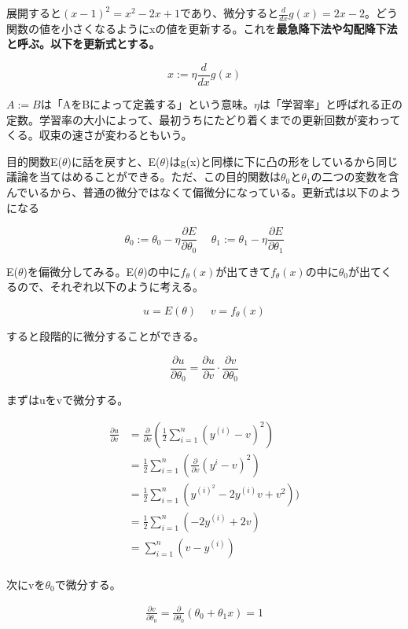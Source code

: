 \documentclass{jsarticle}
\begin{document}
展開すると$(x-1)^{2}=x^{2}-2x+1$であり、微分すると$\frac{d}{dx}g(x)=2x-2$。どう関数の値を小さくなるようにxの値を更新する。これを\bf{最急降下法}や\bf{勾配降下法}と呼ぶ。以下を更新式とする。

\[
	x := \eta\frac{d}{dx}g(x)
\]

$A := B$は「AをBによって定義する」という意味。$\eta$は「学習率」と呼ばれる正の定数。学習率の大小によって、最初うちにたどり着くまでの更新回数が変わってくる。収束の速さが変わるともいう。

目的関数E($\theta$)に話を戻すと、E($\theta$)はg(x)と同様に下に凸の形をしているから同じ議論を当てはめることができる。ただ、この目的関数は$\theta_0$と$\theta_1$の二つの変数を含んでいるから、普通の微分ではなくて偏微分になっている。更新式は以下のようになる

\[
	\theta_0 := \theta_0 - \eta \frac{\partial E}{\partial \theta_0} 
    \hspace{15pt}
    \theta_1 := \theta_1 - \eta \frac{\partial E}{\partial \theta_1}
\]

E($\theta$)を偏微分してみる。E($\theta$)の中に$f_{\theta}(x)$が出てきて$f_{\theta}(x)$の中に$\theta_{0}$が出てくるので、それぞれ以下のように考える。

\[
	u = E(\theta)
    \hspace{15pt}
    v = f_{\theta}(x)
\]

すると段階的に微分することができる。

\[
	\frac{\partial u}{\partial \theta_{0}} = \frac{\partial u}{\partial v} \cdot \frac{\partial v}{\partial \theta_{0}}
\]

まずはuをvで微分する。

\begin{align}
	\frac{\partial u}{\partial v} &= \frac{\partial}{\partial v}(\frac{1}{2}\sum_{i=1}^n(y^{(i)}-v)^{2})\\
    &= \frac{1}{2}\sum_{i=1}^{n}(\frac{\partial}{\partial v}(y^{i}-v)^{2})\\
    &= \frac{1}{2} \sum_{i=1}^{n} (y^{(i)^{2}} - 2y^{(i)}v + v^{2}))\\
    &= \frac{1}{2} \sum_{i=1}^{n} (-2y^{(i)} + 2v)\\
    &= \sum_{i=1}^{n} (v-y^{(i)})\\
\end{align}

次にvを$\theta_0$で微分する。

\begin{align}
	\frac{\partial v}{\partial \theta_0} = \frac{\partial}{\partial \theta_0} (\theta_0 + \theta_1 x)
    = 1
\end{align}
\end{document}
